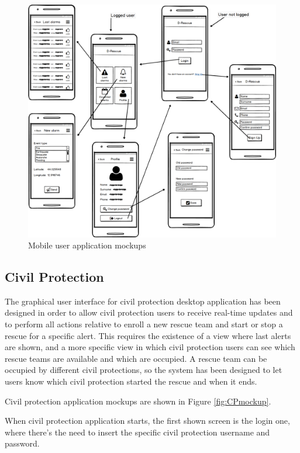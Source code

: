 \documentclass[a4paper,12pt]{report}
\begin{document}
\begin{figure}[h]
\centering
\includegraphics[width=\textwidth]{figures/mockupMobile.png}
\caption{Mobile user application mockups}
\label{fig:Mobilemockup}
\end{figure}

\subsection{Civil Protection}

The graphical user interface for civil protection desktop application has been designed in order to allow civil protection users to receive real-time updates and to perform all actions relative to enroll a new rescue team and start or stop a rescue for a specific alert. This requires the existence of a view where last alerts are shown, and a more specific view in which civil protection users can see which rescue teams are available and which are occupied. A rescue team can be occupied by different civil protections, so the system has been designed to let users know which civil protection started the rescue and when it ends.

Civil protection application mockups are shown in Figure \ref{fig:CPmockup}.

When civil protection application starts, the first shown screen is the login one, where there's the need to insert the specific civil protection username and password.
\end{document}
